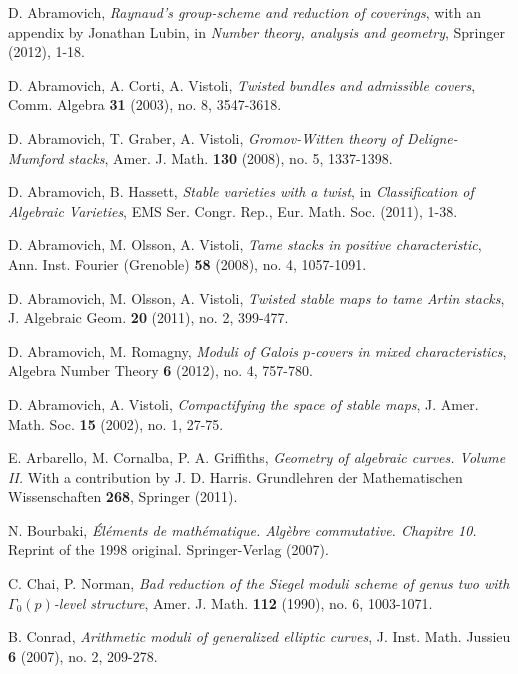 \documentclass[11pt]{amsart}
\theoremstyle{definition}
\begin{document}
\begin{thebibliography}{999999}

 D. Abramovich, \textit{Raynaud's group-scheme and reduction of coverings}, with an appendix by Jonathan Lubin, in \textit{Number theory, analysis and geometry}, Springer (2012), 1-18.

 D. Abramovich, A. Corti, A. Vistoli, \textit{Twisted bundles and admissible covers}, Comm. Algebra \textbf{31} (2003), no. 8, 3547-3618.

 D. Abramovich, T. Graber, A. Vistoli, \textit{Gromov-Witten theory of Deligne-Mumford stacks}, Amer. J. Math. \textbf{130} (2008), no. 5, 1337-1398.

 D. Abramovich, B. Hassett, \textit{Stable varieties with a twist}, in \textit{Classification of Algebraic Varieties}, EMS Ser. Congr. Rep., Eur. Math. Soc. (2011), 1-38.

 D. Abramovich, M. Olsson, A. Vistoli, \textit{Tame stacks in positive characteristic}, Ann. Inst. Fourier (Grenoble) \textbf{58} (2008), no. 4, 1057-1091.

 D. Abramovich, M. Olsson, A. Vistoli, \textit{Twisted stable maps to tame Artin stacks}, J. Algebraic Geom. \textbf{20} (2011), no. 2, 399-477.

 D. Abramovich, M. Romagny, \textit{Moduli of Galois $p$-covers in mixed characteristics}, Algebra Number Theory \textbf{6} (2012), no. 4, 757-780.

 D. Abramovich, A. Vistoli, \textit{Compactifying the space of stable maps}, J. Amer. Math. Soc. \textbf{15} (2002), no. 1, 27-75.

 E. Arbarello, M. Cornalba, P. A. Griffiths, \textit{Geometry of algebraic curves. Volume II.} With a contribution by J. D. Harris. Grundlehren der Mathematischen Wissenschaften \textbf{268}, Springer (2011).

 N. Bourbaki, \textit{\'El\'ements de math\'ematique. Alg\`{e}bre commutative. Chapitre 10.} Reprint of the 1998 original. Springer-Verlag (2007).

 C. Chai, P. Norman, \textit{Bad reduction of the Siegel moduli scheme of genus two with $\Gamma_0(p)$-level structure}, Amer. J. Math. \textbf{112} (1990), no. 6, 1003-1071.

 B. Conrad, \textit{Arithmetic moduli of generalized elliptic curves}, J. Inst. Math. Jussieu \textbf{6} (2007), no. 2, 209-278.


\end{thebibliography}
\end{document}
